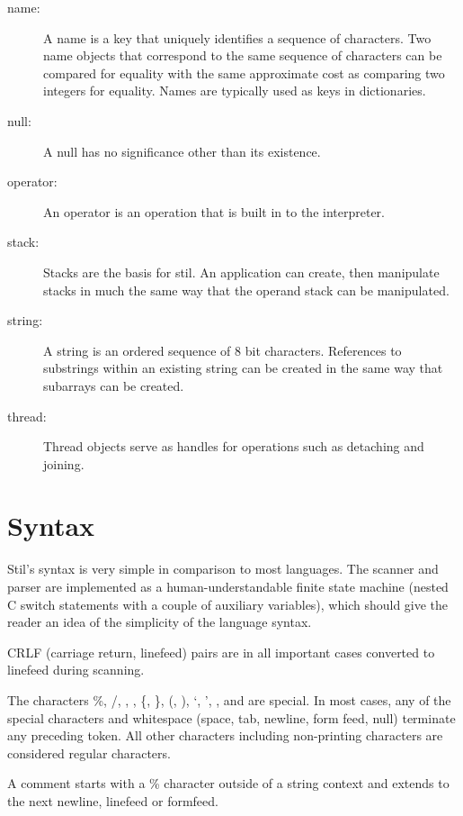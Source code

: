 \begin{description}
\item[name: ] A name is a key that uniquely identifies a sequence of characters.
Two name objects that correspond to the same sequence of characters can be
compared for equality with the same approximate cost as comparing two integers
for equality.  Names are typically used as keys in dictionaries.

\item[null: ] A null has no significance other than its existence.

\item[operator: ] An operator is an operation that is built in to the
interpreter.

\item[stack: ] Stacks are the basis for stil.  An application can create, then
manipulate stacks in much the same way that the operand stack can be
manipulated.

\item[string: ] A string is an ordered sequence of 8 bit characters.  References
to substrings within an existing string can be created in the same way that
subarrays can be created.

\item[thread: ] Thread objects serve as handles for operations such as detaching
and joining.

\end{description}

\section{Syntax}

Stil's syntax is very simple in comparison to most languages.  The scanner and
parser are implemented as a human-understandable finite state machine (nested C
switch statements with a couple of auxiliary variables), which should give the
reader an idea of the simplicity of the language syntax.

CRLF (carriage return, linefeed) pairs are in all important cases converted to
linefeed during scanning.

The characters \%, /, {\lb}, {\rb}, \{, \}, (, ), `, ', {\lt}, and {\gt} are
special.  In most cases, any of the special characters and whitespace (space,
tab, newline, form feed, null) terminate any preceding token.  All other
characters including non-printing characters are considered regular characters.

A comment starts with a \% character outside of a string context and extends to
the next newline, linefeed or formfeed.

